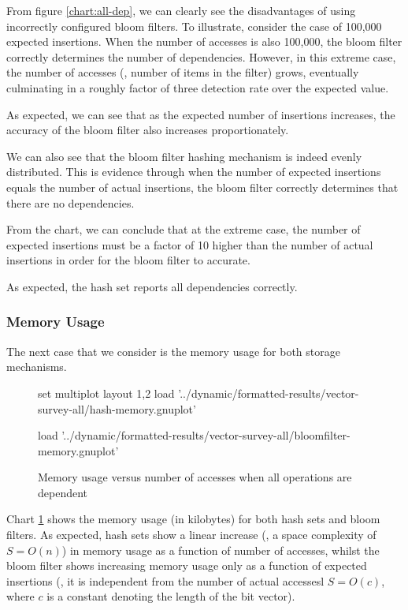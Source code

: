 		From figure \ref{chart:all-dep}, we can clearly see the disadvantages of using incorrectly configured bloom filters. To illustrate, consider the case of 100,000 expected insertions. When the number of accesses is also 100,000, the bloom filter correctly determines the number of dependencies. However, in this extreme case, the number of accesses (\ie, number of items in the filter) grows, eventually culminating in a roughly factor of three detection rate over the expected value.
		
		As expected, we can see that as the expected number of insertions increases, the accuracy of the bloom filter also increases proportionately. 
		
		We can also see that the bloom filter hashing mechanism is indeed evenly distributed. This is evidence through when the number of expected insertions equals the number of actual insertions, the bloom filter correctly determines that there are no dependencies.
		
		From the chart, we can conclude that at the extreme case, the number of expected insertions must be a factor of 10 higher than the number of actual insertions in order for the bloom filter to accurate.
		
		As expected, the hash set reports all dependencies correctly.
			
		\subsubsection{Memory Usage} \label{sec:results/all/mem}
		The next case that we consider is the memory usage for both storage mechanisms.
		
		\begin{figure}
			\centering
			\begin{gnuplot}[terminal=pdf]
				set multiplot layout 1,2
					load '../dynamic/formatted-results/vector-survey-all/hash-memory.gnuplot'
					
					load '../dynamic/formatted-results/vector-survey-all/bloomfilter-memory.gnuplot'
			\end{gnuplot}
			\caption{Memory usage versus number of accesses when all operations are dependent}
			\label{chart:all-mem}
		\end{figure}
		
		Chart \ref{chart:all-mem} shows the memory usage (in kilobytes) for both hash sets and bloom filters. As expected, hash sets show a linear increase (\ie, a space complexity of $S=O(n)$) in memory usage as a function of number of accesses, whilst the bloom filter shows increasing memory usage only as a function of expected insertions (\ie, it is independent from the number of actual accessesl $S=O(c)$, where $c$ is a constant denoting the length of the bit vector).
		
